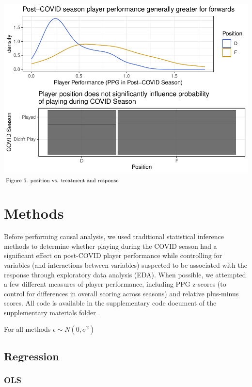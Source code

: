 \documentclass[12pt]{article}
\begin{document}
\includegraphics{journal-article-nb_files/figure-latex/pos-plots-1.pdf}
\(\hspace*{\fill} \footnotesize \text{Figure 5. position vs. treatment and response}\)

\hypertarget{methods}{%
\section{Methods}\label{methods}}

Before performing causal analysis, we used traditional statistical
inference methods to determine whether playing during the COVID season
had a significant effect on post-COVID player performance while
controlling for variables (and interactions between variables) suspected
to be associated with the response through exploratory data analysis
(EDA). When possible, we attempted a few different measures of player
performance, including PPG z-scores (to control for differences in
overall scoring across seasons) and relative plus-minus scores. All code
is available in the supplementary code document of the supplementary
materials folder \citet{author}.

For all methods \(\epsilon \sim N(0, \sigma^2)\)

\hypertarget{regression}{%
\subsection{Regression}\label{regression}}

\hypertarget{ols}{%
\subsubsection{OLS}\label{ols}}
\end{document}
